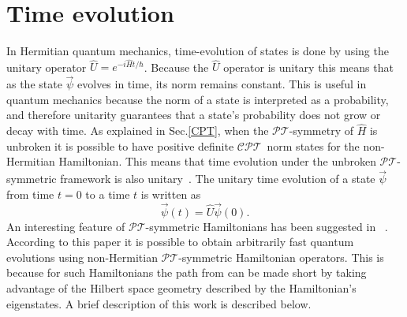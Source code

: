 \documentclass[12pt, a4paper]{report}
\newcommand\PT{\(\mathcal{PT}\)}
\newcommand\CPT{\(\mathcal{CPT}\)}
\begin{document}
\chapter{Time evolution}\label{TEv}
In Hermitian quantum mechanics, time-evolution of states is done by using the unitary operator $\hat{U} = e^{-i\hat{H}t/\hbar}$. Because the $\hat{U}$ operator is unitary this means that as the state $\vec{\psi}$ evolves in time, its norm remains constant. This is useful in quantum mechanics because the norm of a state is interpreted as a probability, and therefore unitarity guarantees that a state's probability does not grow or decay with time. As explained in Sec.\ref{CPT}, when the \PT-symmetry of $\hat{H}$ is unbroken it is possible to have positive definite \CPT norm states for the non-Hermitian Hamiltonian. This means that time evolution under the unbroken \PT-symmetric framework is also unitary~\cite{Jones-Smith, ComplexExtension, Mostafazadeh2}. 
The unitary time evolution of a state $\vec{\psi}$ from time $t = 0$ to a time $t$ is written as
\begin{equation}\label{eq:4.1}
\vec{\psi}(t) = \hat{U} \vec{\psi}(0).
\end{equation}
An interesting feature of \PT-symmetric Hamiltonians has been suggested in ~\cite{Bender_2007}. According to this paper it is possible to obtain arbitrarily fast quantum evolutions using non-Hermitian \PT-symmetric Hamiltonian operators. This is because for such Hamiltonians the path from can be made short by taking advantage of the Hilbert space geometry described by the Hamiltonian's eigenstates. A brief description of this work is described below.

\end{document}
